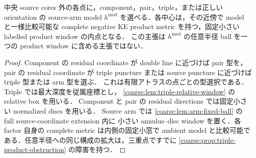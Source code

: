 \documentclass[a4paper,11pt]{ltjsarticle}
\numberwithin{equation}{section}
\theoremstyle{plain}
\theoremstyle{definition}
\theoremstyle{remark}
\begin{document}


\begin{lemma}[局所型の選択と固定小窓]\label{coarse:lem:terminal-reduction}
中央 source cores 外の各点に，component，pair，triple，または正しい orientation の source-arm model
$h^{\mathrm{mod}}$ を選べる．各中心は，その近傍で model と一様比較可能な complete negative KE
product metric を持つ，固定小さい labelled product window の内点となる．
この主張は $h^{\mathrm{mod}}$ の任意半径 ball を一つの product window に含める主張ではない．
\end{lemma}

\begin{proof}
Component の residual coordinate が double line に近づけば pair 型を，pair の residual coordinate が
triple puncture または source puncture に近づけば triple 型または arm 型を選ぶ．
これは有限アトラスの点ごとの型選択である．Triple では最大深度を従属座標とし，
\cref{coarse:lem:triple-relative-window} の relative box を用いる．
Component と pair の residual directions では固定小さい normalized discs を用いる．
Source arm では \cref{coarse:lem:arm-fixed-ball} の full source-coordinate extension 内に
小さい annulus--disc window を置く．各 factor 自身の complete metric は内側の固定小窓で
ambient model と比較可能である．任意半径への同じ構成の拡大は，三重点ですでに
\cref{coarse:prop:triple-product-obstruction} の障害を持つ．
\end{proof}
\end{document}
